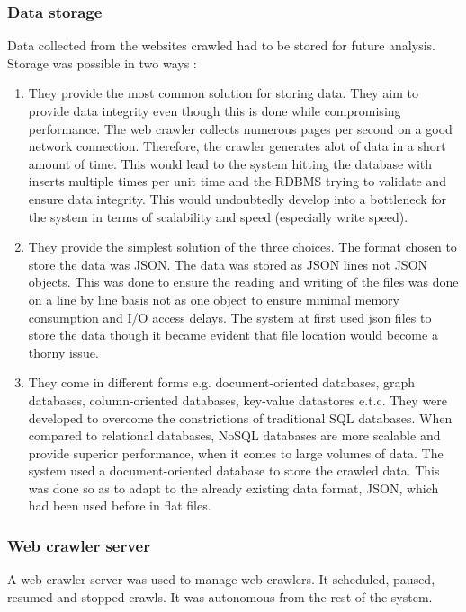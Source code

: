 \subsubsection{Data storage}
\noindent
Data collected from the websites crawled had to be stored for future analysis. Storage was possible in two ways : 
\begin{enumerate}
\item {}
\noindent
They provide the most common solution for storing data. They aim to provide data integrity even though this is done while compromising performance. The web crawler collects numerous pages per second on a good network connection. Therefore, the crawler generates alot of data in a short amount of time. This would lead to the system hitting the database with inserts multiple times per unit time and the RDBMS trying to validate and ensure data integrity. This would undoubtedly develop into a bottleneck for the system in terms of scalability and speed (especially write speed).

\item {}
\noindent
They provide the simplest solution of the three choices. The format chosen to store the data was JSON. The data was stored as JSON lines not JSON objects. This was done to ensure the reading and writing of the files was done on a line by line basis not as one object to ensure minimal memory consumption and I/O access delays. The system at first used json files to store the data though it became evident that file location would become a thorny issue. 

\item {}
\noindent
They come in different forms e.g. document-oriented databases, graph databases, column-oriented databases, key-value datastores e.t.c. They were developed to overcome the constrictions of traditional SQL databases. When compared to relational databases, NoSQL databases are more scalable and provide superior performance, when it comes to large volumes of data. The system used a document-oriented database to store the crawled data. This was done so as to adapt to the already existing data format, JSON, which had been used before in flat files.
\end{enumerate}

\subsubsection{Web crawler server}
A web crawler server was used to manage web crawlers. It scheduled, paused, resumed and stopped crawls. It was autonomous from the rest of the system.

